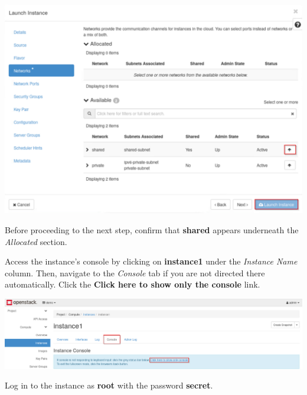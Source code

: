 \documentclass[letterpaper, 12pt]{article}
\begin{document}
\begin{enumerate}
\begin{labstep}
        \begin{center}
            \includegraphics[width=\linewidth]{images/part1/step8.png}
        \end{center}
    \end{labstep}

    \begin{stopbox}
        Before proceeding to the next step, confirm that \textbf{shared} appears underneath the \textit{Allocated} section.
    \end{stopbox}

    \begin{labstep}
        Access the instance's console by clicking on \textbf{instance1} under the \textit{Instance Name} column.
        Then, navigate to the \textit{Console} tab if you are not directed there automatically.
        Click the \textbf{Click here to show only the console} link.

        \begin{center}
            \includegraphics[width=\linewidth]{images/part1/step9.png}
        \end{center}
    \end{labstep}

    \begin{labstep}
        Log in to the instance as \textbf{root} with the password \textbf{secret}.


\end{labstep}
\end{enumerate}
\end{document}
